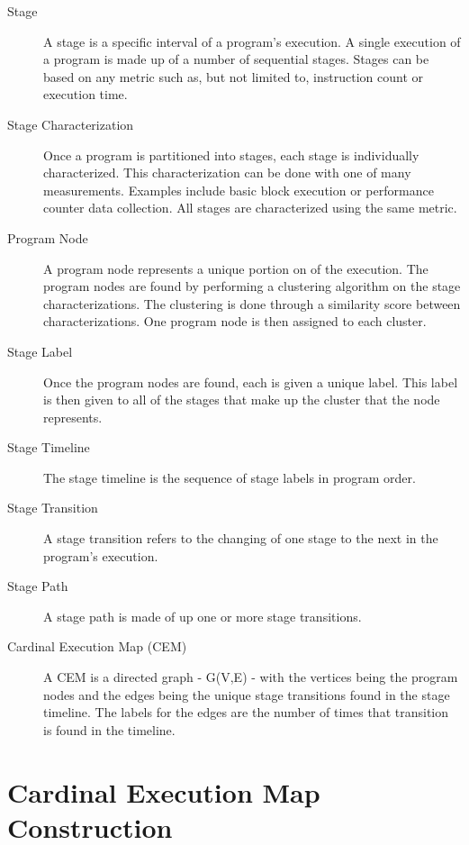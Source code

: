 \begin{description}

    \item[Stage] A stage is a specific interval of a program's
execution. A single execution of a program is made up of a number
of sequential stages. Stages can be based on any metric such
as, but not limited to, instruction count or execution time.

    \item[Stage Characterization] Once a program is partitioned into
stages, each stage is individually characterized. This
characterization can be done with one of many measurements. Examples
include basic block execution or performance counter data
collection. All stages are characterized using the same metric.

    \item[Program Node] A program node represents a unique portion on
of the execution. The program nodes are found by performing a
clustering algorithm on the stage characterizations. The clustering is
done through a similarity score between characterizations. One program
node is then assigned to each cluster.

    \item[Stage Label] Once the program nodes are found, each is given
a unique label. This label is then given to all of the stages that
make up the cluster that the node represents.

    \item[Stage Timeline] The stage timeline is the sequence of stage
labels in program order.

    \item[Stage Transition] A stage transition refers to the changing
of one stage to the next in the program's execution.

    \item[Stage Path] A stage path is made of up one or more stage
transitions.

    \item[Cardinal Execution Map (CEM)] A CEM is a directed graph -
G(V,E) - with the vertices being the program nodes and the edges being
the unique stage transitions found in the stage timeline. The labels
for the edges are the number of times that transition is found in the
timeline.

\end{description}

\section{Cardinal Execution Map Construction}~\label{sec:meth_exe-create}

